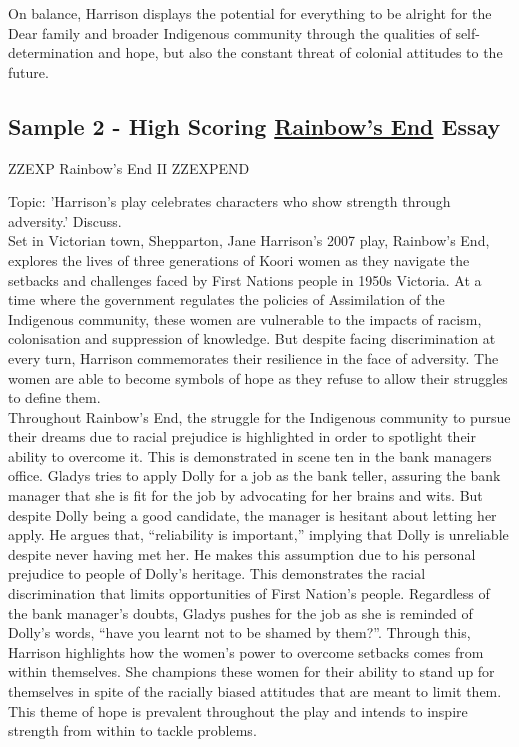 \documentclass[a4paper]{article}
\begin{document}
On balance, Harrison displays the potential for everything to be alright for the Dear family and
broader Indigenous community through the qualities of self-determination and hope, but also the
constant threat of colonial attitudes to the future.\\

\subsection{Sample 2 - High Scoring \underline{Rainbow's End} Essay}


ZZEXP Rainbow's End II ZZEXPEND



Topic: 'Harrison’s play celebrates characters who show strength through adversity.' Discuss.\\

Set in Victorian town, Shepparton, Jane Harrison’s 2007 play, Rainbow’s End, explores the
lives of three generations of Koori women as they navigate the setbacks and challenges
faced by First Nations people in 1950s Victoria. At a time where the government regulates
the policies of Assimilation of the Indigenous community, these women are vulnerable to the
impacts of racism, colonisation and suppression of knowledge. But despite facing
discrimination at every turn, Harrison commemorates their resilience in the face of adversity.
The women are able to become symbols of hope as they refuse to allow their struggles to
define them.\\

Throughout Rainbow’s End, the struggle for the Indigenous community to pursue their
dreams due to racial prejudice is highlighted in order to spotlight their ability to overcome it.
This is demonstrated in scene ten in the bank managers office. Gladys tries to apply Dolly
for a job as the bank teller, assuring the bank manager that she is fit for the job by
advocating for her brains and wits. But despite Dolly being a good candidate, the manager is
hesitant about letting her apply. He argues that, “reliability is important,” implying that Dolly is
unreliable despite never having met her. He makes this assumption due to his personal
prejudice to people of Dolly’s heritage. This demonstrates the racial discrimination that limits
opportunities of First Nation’s people. Regardless of the bank manager's doubts, Gladys
pushes for the job as she is reminded of Dolly’s words, “have you learnt not to be shamed by
them?”. Through this, Harrison highlights how the women’s power to overcome setbacks
comes from within themselves. She champions these women for their ability to stand up for
themselves in spite of the racially biased attitudes that are meant to limit them. This theme of
hope is prevalent throughout the play and intends to inspire strength from within to tackle
problems.\\
\end{document}
